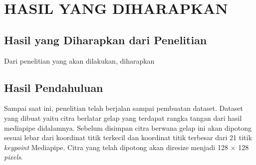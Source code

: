 \section{HASIL YANG DIHARAPKAN}

\subsection{Hasil yang Diharapkan dari Penelitian}

Dari penelitian yang akan dilakukan, diharapkan \lipsum[15]

\subsection{Hasil Pendahuluan}
Sampai saat ini, penelitian telah berjalan sampai pembuatan dataset. Dataset yang dibuat yaitu citra berlatar gelap yang terdapat rangka tangan dari hasil mediapipe didalamnya. Sebelum disimpan citra berwana gelap ini akan dipotong sesuai lebar dari koordinat titik terkecil dan koordinat titik terbesar dari 21 titik \textit{keypoint} Mediapipe. Citra yang telah dipotong akan diresize menjadi 128 $\times$ 128 \textit{pixels}.
